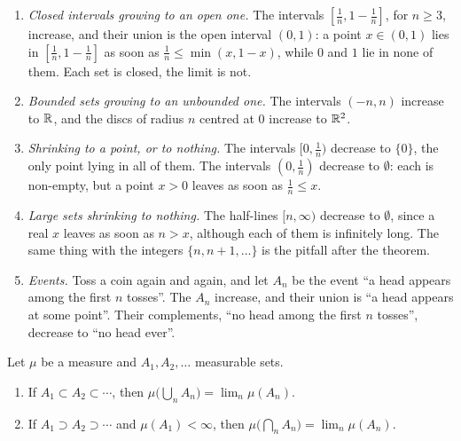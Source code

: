 \begin{notechapter}
\begin{example}
\label{measures:ex:monotone}
\leavevmode
\begin{enumerate}[nosep]
  \item \emph{Closed intervals growing to an open one.} The intervals
        $[\frac1n, 1 - \frac1n]$, for $n\geq3$, increase, and their union
        is the open interval $(0, 1)$: a point $x\in(0, 1)$ lies in
        $[\frac1n, 1 - \frac1n]$ as soon as $\frac1n\leq\min(x, 1 - x)$,
        while $0$ and $1$ lie in none of them. Each set is closed, the
        limit is not.
  \item \emph{Bounded sets growing to an unbounded one.} The intervals
        $(-n, n)$ increase to $\mathbb{R}$, and the discs of radius $n$ centred
        at $0$ increase to $\mathbb{R}^2$.
  \item \emph{Shrinking to a point, or to nothing.} The intervals
        $[0, \frac1n)$ decrease to $\{0\}$, the only point lying in all
        of them. The intervals $(0, \frac1n)$ decrease to $\emptyset$:
        each is non-empty, but a point $x > 0$ leaves as soon as
        $\frac1n\leq x$.
  \item \emph{Large sets shrinking to nothing.} The half-lines
        $[n, \infty)$ decrease to $\emptyset$, since a real $x$ leaves as
        soon as $n > x$, although each of them is infinitely long. The
        same thing with the integers $\{n, n + 1, \dots\}$ is the
        pitfall after the theorem.
  \item \emph{Events.} Toss a coin again and again, and let $A_n$ be
        the event ``a head appears among the first $n$ tosses''. The
        $A_n$ increase, and their union is ``a head appears at some
        point''. Their complements, ``no head among the first $n$
        tosses'', decrease to ``no head ever''.
\end{enumerate}
\end{example}

\begin{theorem}\label{measures:thm:continuity}
Let $\mu$ be a measure and $A_1, A_2, \dots$ measurable sets.
\begin{enumerate}[nosep]
  \item If $A_1\subset A_2\subset\cdots$, then
        $\mu\bigl(\bigcup_nA_n\bigr) = \lim_n\mu(A_n)$.
  \item If $A_1\supset A_2\supset\cdots$ and $\mu(A_1) < \infty$, then
        $\mu\bigl(\bigcap_nA_n\bigr) = \lim_n\mu(A_n)$.
\end{enumerate}
\end{theorem}


\end{notechapter}
